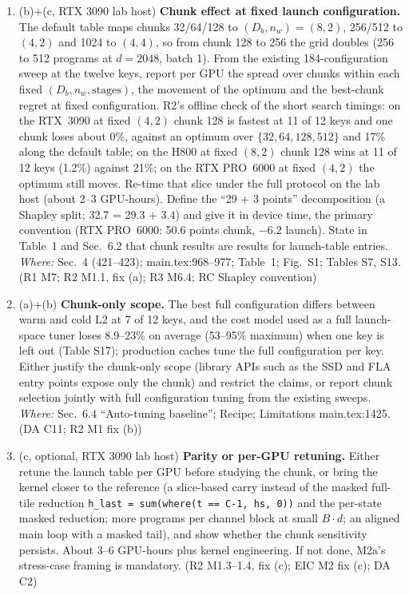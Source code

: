 \documentclass[11pt]{article}
\begin{document}
\begin{enumerate}[label=M2\alph*.]
        Define each once per kernel, label every exception, and state up
        front that the production-kernel tuning gains are those of Table~7.
        (DA C19, C12; R3 M6.3; EIC M2)
  \item (b)+(c, RTX 3090 lab host) \textbf{Chunk effect at fixed launch
        configuration.} The default table maps chunks 32/64/128 to $(D_b,
        n_w)=(8,2)$, 256/512 to $(4,2)$ and 1024 to $(4,4)$, so from chunk 128
        to 256 the grid doubles (256 to 512 programs at $d=2048$, batch 1).
        From the existing 184-configuration sweep at the twelve keys, report
        per GPU the spread over chunks within each fixed $(D_b, n_w,
        \mbox{stages})$, the movement of the optimum and the best-chunk
        regret at fixed configuration. R2's offline check of the short search
        timings: on the RTX~3090 at fixed $(4,2)$ chunk 128 is fastest at 11
        of 12 keys and one chunk loses about 0\%, against an optimum over
        $\{32,64,128,512\}$ and 17\% along the default table; on the H800 at
        fixed $(8,2)$ chunk 128 wins at 11 of 12 keys (1.2\%) against 21\%;
        on the RTX PRO~6000 at fixed $(4,2)$ the optimum still moves.
        Re-time that slice under the full protocol on the lab host (about 2--3
        GPU-hours). Define the ``29 + 3 points'' decomposition (a Shapley
        split; 32.7 = 29.3 + 3.4) and give it in device time, the primary
        convention (RTX PRO~6000: 50.6 points chunk, $-6.2$ launch). State in
        Table~1 and Sec.~6.2 that chunk results are results for launch-table
        entries. \emph{Where:} Sec.~4 (421--423); main.tex:968--977; Table~1;
        Fig.~S1; Tables S7, S13. (R1 M7; R2 M1.1, fix (a); R3 M6.4; RC
        Shapley convention)
  \item (a)+(b) \textbf{Chunk-only scope.} The best full configuration differs
        between warm and cold L2 at 7 of 12 keys, and the cost model used as a
        full launch-space tuner loses 8.9--23\% on average (53--95\% maximum)
        when one key is left out (Table S17); production caches tune the full
        configuration per key. Either justify the chunk-only scope (library
        APIs such as the SSD and FLA entry points expose only the chunk) and
        restrict the claims, or report chunk selection jointly with full
        configuration tuning from the existing sweeps. \emph{Where:}
        Sec.~6.4 ``Auto-tuning baseline''; Recipe; Limitations main.tex:1425.
        (DA C11; R2 M1 fix (b))
  \item (c, optional, RTX 3090 lab host) \textbf{Parity or per-GPU retuning.}
        Either retune the launch table per GPU before studying the chunk, or
        bring the kernel closer to the reference (a slice-based carry instead
        of the masked full-tile reduction
        \texttt{h\_last = sum(where(t == C-1, hs, 0))} and the per-state
        masked reduction; more programs per channel block at small $B\cdot d$;
        an aligned main loop with a masked tail), and show whether the chunk
        sensitivity persists. About 3--6 GPU-hours plus kernel engineering.
        If not done, M2a's stress-case framing is mandatory. (R2 M1.3--1.4,
        fix (c); EIC M2 fix (c); DA C2)
\end{enumerate}
\end{document}
